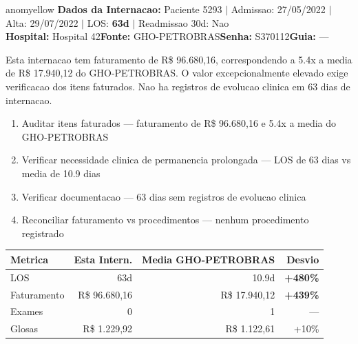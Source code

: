 \documentclass[a4paper,10pt]{article}
\begin{document}
\begin{anomalycard}[Internacao 4989 | GHO-PETROBRAS | MODERADO (z=2.12)]{anomyellow}
\textbf{Dados da Internacao:} Paciente 5293 $\mid$ Admissao: 27/05/2022 $\mid$ Alta: 29/07/2022 $\mid$ LOS: \textbf{63d} $\mid$ Readmissao 30d: Nao\\
\textbf{Hospital:} Hospital 42\quad\textbf{Fonte:} GHO-PETROBRAS\quad\textbf{Senha:} S370112\quad\textbf{Guia:} ---\\
\vspace{2pt}\begin{tcolorbox}[colback=severityred!20,colframe=anomyellow,title={\textbf{Interpretacao de Negocio}},fonttitle=\bfseries\small,left=4pt,right=4pt,top=3pt,bottom=3pt]
{\small Esta internacao tem faturamento de R\$ 96.680,16, correspondendo a 5.4x a media de R\$ 17.940,12 do GHO-PETROBRAS. O valor excepcionalmente elevado exige verificacao dos itens faturados. Nao ha registros de evolucao clinica em 63 dias de internacao.}
\end{tcolorbox}
\begin{tcolorbox}[colback=severityyellow!30,colframe=anomorange,title={\textbf{Recomendacoes Especificas}},fonttitle=\bfseries\small,left=4pt,right=4pt,top=3pt,bottom=3pt]
\begin{enumerate}[nosep,leftmargin=16pt]
\item {\small Auditar itens faturados --- faturamento de R\$ 96.680,16 e 5.4x a media do GHO-PETROBRAS}
\item {\small Verificar necessidade clinica de permanencia prolongada --- LOS de 63 dias vs media de 10.9 dias}
\item {\small Verificar documentacao --- 63 dias sem registros de evolucao clinica}
\item {\small Reconciliar faturamento vs procedimentos --- nenhum procedimento registrado}
\end{enumerate}
\end{tcolorbox}
\begin{center}\begin{tabular}{l r r r}\toprule\textbf{Metrica} & \textbf{Esta Intern.} & \textbf{Media GHO-PETROBRAS} & \textbf{Desvio} \\\midrule
LOS & 63d & 10.9d & \textcolor{anomred}{\textbf{+480\%}} \\
Faturamento & R\$ 96.680,16 & R\$ 17.940,12 & \textcolor{anomred}{\textbf{+439\%}} \\
Exames & 0 & 1 & --- \\
Glosas & R\$ 1.229,92 & R\$ 1.122,61 & +10\% \\
\bottomrule\end{tabular}\end{center}


\end{anomalycard}
\end{document}
